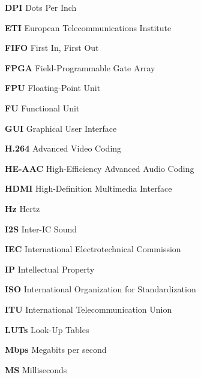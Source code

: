 \begin{description}
    \item \hspace{2mm} \textbf{DPI} Dots Per Inch
    \item \hspace{2mm} \textbf{ETI} European Telecommunications Institute
    \item \hspace{2mm} \textbf{FIFO} First In, First Out
    \item \hspace{2mm} \textbf{FPGA} Field-Programmable Gate Array
    \item \hspace{2mm} \textbf{FPU} Floating-Point Unit
    \item \hspace{2mm} \textbf{FU} Functional Unit
    \item \hspace{2mm} \textbf{GUI} Graphical User Interface
    \item \hspace{2mm} \textbf{H.264} Advanced Video Coding
    \item \hspace{2mm} \textbf{HE-AAC} High-Efficiency Advanced Audio Coding
    \item \hspace{2mm} \textbf{HDMI} High-Definition Multimedia Interface
    \item \hspace{2mm} \textbf{Hz} Hertz
    \item \hspace{2mm} \textbf{I2S} Inter-IC Sound
    \item \hspace{2mm} \textbf{IEC} International Electrotechnical Commission
    \item \hspace{2mm} \textbf{IP} Intellectual Property
    \item \hspace{2mm} \textbf{ISO} International Organization for Standardization
    \item \hspace{2mm} \textbf{ITU} International Telecommunication Union
    \item \hspace{2mm} \textbf{LUTs} Look-Up Tables
    \item \hspace{2mm} \textbf{Mbps} Megabits per second
    \item \hspace{2mm} \textbf{MS} Milliseconds

\end{description}
